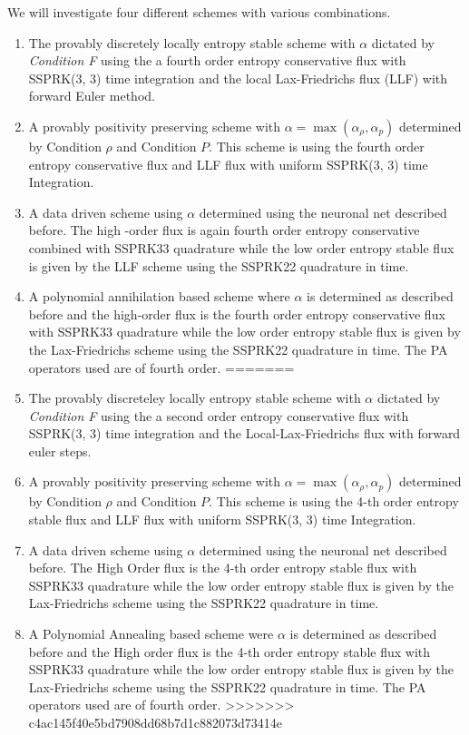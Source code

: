 	We will investigate four different schemes with various combinations.	\begin{enumerate}
<<<<<<< HEAD
		\item The provably discretely locally entropy stable scheme with $\alpha$ dictated by \emph{Condition F} using the a fourth order entropy conservative flux with SSPRK(3, 3) time integration and the local Lax-Friedrichs flux (LLF) with forward Euler  method.
		\item A provably positivity preserving scheme with $\alpha = \max(\alpha_\rho, \alpha_p)$ determined by Condition $\rho$ and Condition $P$. This scheme is using the fourth order entropy conservative flux and LLF flux with uniform SSPRK(3, 3) time Integration.
		\item A data driven scheme using $\alpha$ determined using the neuronal net described before. The high -order flux is again fourth order entropy conservative  combined with SSPRK33 quadrature while the low order entropy stable flux is given by the  LLF scheme using the SSPRK22 quadrature in time.
		\item A polynomial annihilation based scheme where $\alpha$ is determined as described before and the high-order flux is the fourth order entropy conservative flux with SSPRK33 quadrature while the low order entropy stable flux is given by the Lax-Friedrichs scheme using the SSPRK22 quadrature in time. The PA operators used are of fourth order.
=======
		\item The provably discreteley locally entropy stable scheme with $\alpha$ dictated by \emph{Condition F} using the a second order entropy conservative flux with SSPRK(3, 3) time integration and the Local-Lax-Friedrichs flux with forward euler steps.
		\item A provably positivity preserving scheme with $\alpha = \max(\alpha_\rho, \alpha_p)$ determined by Condition $\rho$ and Condition $P$. This scheme is using the 4-th order entropy stable flux and LLF flux with uniform SSPRK(3, 3) time Integration.
		\item A data driven scheme using $\alpha$ determined using the neuronal net described before. The High Order flux is the 4-th order entropy stable flux with SSPRK33 quadrature while the low order entropy stable flux is given by the Lax-Friedrichs scheme using the SSPRK22 quadrature in time.
		\item A Polynomial Annealing based scheme were $\alpha$ is determined as described before and the High order flux is the 4-th order entropy stable flux with SSPRK33 quadrature while the low order entropy stable flux is given by the Lax-Friedrichs scheme using the SSPRK22 quadrature in time. The PA operators used are of fourth order.
>>>>>>> c4ac145f40e5bd7908dd68b7d1c882073d73414e
	\end{enumerate}
